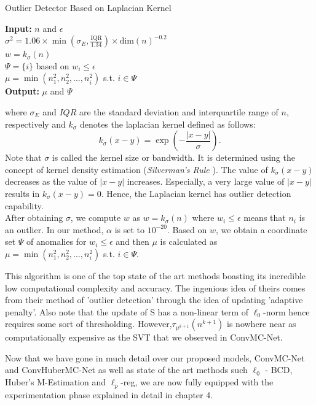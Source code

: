 \begin{algorithm}
\caption{Outlier Detector Based on Laplacian Kernel}
\textbf{Input:} $n$ and $\epsilon$ \\
$\sigma^2 = 1.06 \times \min(\sigma_E, \frac{\text{IQR}}{1.34}) \times \text{dim}(n)^{-0.2}$ \\
$w = k_{\sigma}(n)$ \\
$\Psi = \{i\}$ based on $w_i \leq \epsilon$ \\
$\mu = \min(n^2_1, n^2_2, \ldots, n^2_i)$ s.t. $i \in \Psi$ \\
\textbf{Output:} $\mu$ and $\Psi$
\end{algorithm}

where $\sigma_E$ and $IQR$ are the standard deviation and interquartile range of $n$, respectively and $k_{\sigma}$ denotes the laplacian kernel defined as follows: \\
\[
k_{\sigma}(x - y) = \exp\left(-\frac{|x - y|}{\sigma}\right). 
\]
Note that $\sigma$ is called the kernel size or bandwidth. It is determined using the concept of kernel density estimation (\textit{Silverman's Rule} \cite{silverman}). The value of $k_{\sigma}(x - y)$ decreases as the value of $|x - y|$ increases. Especially, a very large value of $|x - y|$ results in $k_{\sigma}(x - y) = 0$. Hence, the Laplacian kernel has outlier detection capability. \\

After obtaining $\sigma$, we compute $w$ as $w = k_{\sigma}(n)$ where $w_i \leq \epsilon$ means that $n_i$ is an outlier. In our method, $\alpha$ is set to $10^{-20}$. Based on $w$, we obtain a coordinate set $\Psi$ of anomalies for $w_i \leq \epsilon$ and then $\mu$ is calculated as $\mu = \min(n^2_1, n^2_2, \ldots, n^2_i)$ s.t. $i \in \Psi$.

This algorithm is one of the top state of the art methods boasting its incredible low computational complexity and accuracy. The ingenious idea of theirs comes from their method of 'outlier detection' through the idea of updating 'adaptive penalty'. Also note that the update of S has a non-linear term of \(\ell_0\)-norm hence requires some sort of thresholding. However,$ \tau_{\mu^{k+1}}(n^{k+1})$ is nowhere near as computationally expensive as the SVT that we observed in ConvMC-Net.

Now that we have gone in much detail over our proposed models, ConvMC-Net and ConvHuberMC-Net as well as state of the art methods such $\ell_{0}$ - BCD, Huber's M-Estimation and $\ell_{p}$-reg, we are now fully equipped with the experimentation phase explained in detail in chapter 4.


